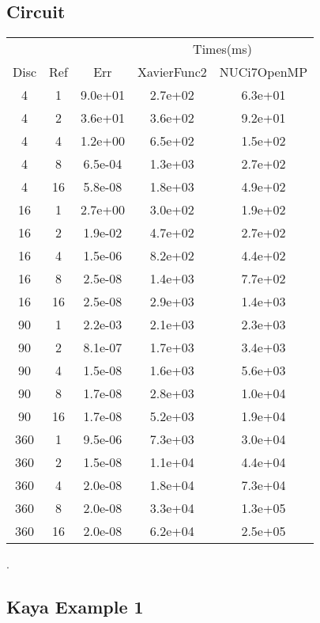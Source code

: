 \subsection{Circuit}
\begin{center}
\begin{tabular}{c|c|c|c|c}
	&&&\multicolumn{2}{|c}{Times(ms)}\\
	Disc&Ref&Err&XavierFunc2&NUCi7OpenMP\\
\hline
4&1&9.0e+01&2.7e+02&6.3e+01\\
4&2&3.6e+01&3.6e+02&9.2e+01\\
4&4&1.2e+00&6.5e+02&1.5e+02\\
4&8&6.5e-04&1.3e+03&2.7e+02\\
4&16&5.8e-08&1.8e+03&4.9e+02\\
\hline
16&1&2.7e+00&3.0e+02&1.9e+02\\
16&2&1.9e-02&4.7e+02&2.7e+02\\
16&4&1.5e-06&8.2e+02&4.4e+02\\
16&8&2.5e-08&1.4e+03&7.7e+02\\
16&16&2.5e-08&2.9e+03&1.4e+03\\
\hline
90&1&2.2e-03&2.1e+03&2.3e+03\\
90&2&8.1e-07&1.7e+03&3.4e+03\\
90&4&1.5e-08&1.6e+03&5.6e+03\\
90&8&1.7e-08&2.8e+03&1.0e+04\\
90&16&1.7e-08&5.2e+03&1.9e+04\\
\hline
360&1&9.5e-06&7.3e+03&3.0e+04\\
360&2&1.5e-08&1.1e+04&4.4e+04\\
360&4&2.0e-08&1.8e+04&7.3e+04\\
360&8&2.0e-08&3.3e+04&1.3e+05\\
360&16&2.0e-08&6.2e+04&2.5e+05\\
\hline
\end{tabular}
\end{center}.\subsection{Kaya Example 1}
